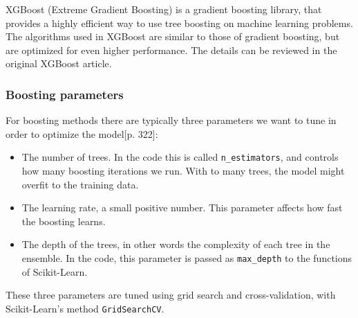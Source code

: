 XGBoost (Extreme Gradient Boosting) is a gradient boosting library, that provides a highly efficient way to use tree boosting on machine learning problems. The algorithms used in XGBoost are similar to those of gradient boosting, but are optimized for even higher performance. The details can be reviewed in the original XGBoost article\cite{Chen}.

\subsubsection{Boosting parameters}

For boosting methods there are typically three parameters we want to tune in order to optimize the model\cite{James}[p. 322]:

\begin{itemize}
    \item The number of trees. In the code this is called \texttt{n\_estimators}, and controls how many boosting iterations we run. With to many trees, the model might overfit to the training data.
    \item The learning rate, a small positive number. This parameter affects how fast the boosting learns.
    \item The depth of the trees, in other words the complexity of each tree in the ensemble. In the code, this parameter is passed as \texttt{max\_depth} to the functions of Scikit-Learn.
\end{itemize}

These three parameters are tuned using grid search and cross-validation, with Scikit-Learn's method \texttt{GridSearchCV}.


